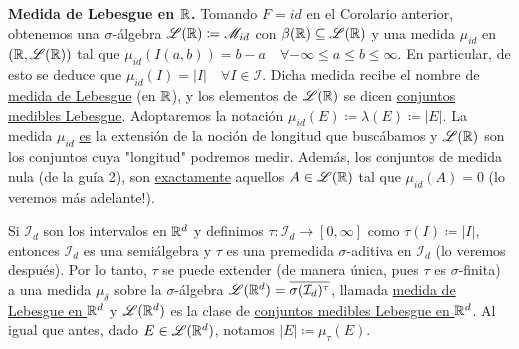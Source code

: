 \begin{eg}[Importante!]
	\textbf{Medida de Lebesgue en $\mathbb{R}$.} Tomando $F = id$ en el Corolario anterior, obtenemos una $\sigma$-álgebra $\mathscr{L}(\mathbb{R}) \coloneq \mathscr{M}_{id}$ con $\beta(\mathbb{R}) \subseteq \mathscr{L}(\mathbb{R})$ y una medida $\mu_{id}$ en $(\mathbb{R},\mathscr{L}(\mathbb{R}))$ tal que $\mu_{id}(I(a,b)) = b-a \quad \forall -\infty \leq a \leq b \leq \infty$. En particular, de esto se deduce que $\mu_{id}(I) = |I|\quad \forall I \in \mathcal{I}$. Dicha medida recibe el nombre de \underline{medida de Lebesgue} (en $\mathbb{R}$), y los elementos de $\mathscr{L}(\mathbb{R})$ se dicen \underline{conjuntos medibles Lebesgue}. Adoptaremos la notación $\mu_{id}(E) \coloneq \lambda(E) \coloneq |E|$. La medida $\mu_{id}$ \underline{es} la extensión de la noción de longitud que buscábamos y $\mathscr{L}(\mathbb{R})$ son los conjuntos cuya "longitud" podremos medir. Además, los conjuntos de medida nula (de la guía 2), son \underline{exactamente} aquellos $A \in \mathscr{L}(\mathbb{R})$ tal que $\mu_{id}(A) = 0$ (lo veremos más adelante!).
\end{eg}

\begin{eg}
	Si $\mathcal{I}_d$ son los intervalos en $\mathbb{R}^d$ y definimos $\tau:\mathcal{I}_d \to [0,\infty]$ como $\tau(I)\coloneq|I|$, entonces $\mathcal{I}_d$ es una semiálgebra y $\tau$ es una premedida $\sigma$-aditiva en $\mathcal{I}_d$ (lo veremos después). Por lo tanto, $\tau$ se puede extender (de manera única, pues $\tau$ es $\sigma$-finita) a una medida $\mu_{\delta}$ sobre la $\sigma$-álgebra $\mathscr{L}(\mathbb{R}^d) = \overline{\sigma(\mathcal{I}_d)^{\tau}}$, llamada \underline{medida de Lebesgue en $\mathbb{R}^d$} y $\mathscr{L}(\mathbb{R}^d)$ es la clase de \underline{conjuntos medibles Lebesgue en $\mathbb{R}^d$}. Al igual que antes, dado $E \in \mathscr{L}(\mathbb{R}^d)$, notamos $|E| \coloneq \mu_{\tau}(E)$.
\end{eg}
